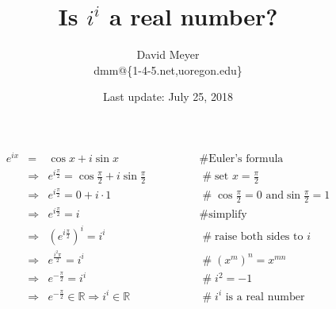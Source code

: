 \documentclass[11pt, oneside]{article}   	%
\begin{document}
\title {Is $i^i$ a real number?}
\author{David Meyer \\ dmm@\{1-4-5.net,uoregon.edu\}}

\date{Last update: July 25, 2018}							%
\maketitle


\begin{equation*}
\begin{array}{lllll}
e^{ix}
&=& \cos x + i \sin x                                                                                                   &\qquad \qquad  \mathrel{\#} \text{Euler's formula}                                                      \\ 
&\Rightarrow& e^{i \frac{\pi}{2}}  = \cos \frac{\pi}{2} + i \sin \frac{\pi}{2}                    &\qquad  \qquad  \mathrel{\#} \text{set $x = \frac{\pi}{2}$}                                            \\
&\Rightarrow& e^{i \frac{\pi}{2}}  = 0 +  i \cdot 1                                                       &\qquad  \qquad  \mathrel{\#} \cos \frac{\pi}{2} = 0 \text{ and} \sin \frac{\pi}{2} = 1       \\
&\Rightarrow& e^{i \frac{\pi}{2}}  =  i                                                                         &\qquad  \qquad  \mathrel{\#} \text{simplify}                                                                  \\
&\Rightarrow& (e^{i \frac{\pi}{2}})^i =  i^i                                                                   &\qquad  \qquad  \mathrel{\#} \text{raise both sides to $i$}                                           \\
&\Rightarrow& e^{\frac{i^2 \pi}{2}} =  i^i                                                                    &\qquad  \qquad  \mathrel{\#}  (x^m)^n = x^{mn}                                                           \\
&\Rightarrow& e^{- \frac {\pi}{2}} =  i^i                                                                      &\qquad  \qquad  \mathrel{\#} i^2 = -1                                                                            \\
&\Rightarrow& e^{- \frac {\pi}{2}} \in \mathbb{R} \Rightarrow i^i \in \mathbb{R}       &\qquad  \qquad  \mathrel{\#} \text{$i^i$ is a real number}                   
                                                        
                                                        
                                                      
\end{array}
\end{equation*}
\end{document}
